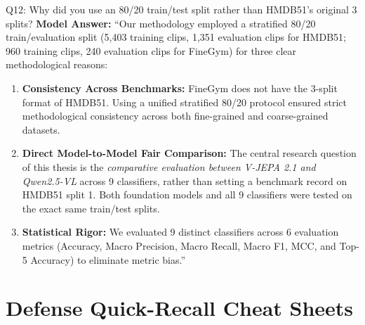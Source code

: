 \documentclass[a4paper, 11pt]{article}
\begin{document}
\vspace{0.2cm}

\begin{defensebox}{Q12: Why did you use an 80/20 train/test split rather than HMDB51's original 3 splits?}
\textbf{Model Answer:}
``Our methodology employed a stratified 80/20 train/evaluation split (5,403 training clips, 1,351 evaluation clips for HMDB51; 960 training clips, 240 evaluation clips for FineGym) for three clear methodological reasons:
\begin{enumerate}
    \item \textbf{Consistency Across Benchmarks:} FineGym does not have the 3-split format of HMDB51. Using a unified stratified 80/20 protocol ensured strict methodological consistency across both fine-grained and coarse-grained datasets.
    \item \textbf{Direct Model-to-Model Fair Comparison:} The central research question of this thesis is the \emph{comparative evaluation between V-JEPA 2.1 and Qwen2.5-VL} across 9 classifiers, rather than setting a benchmark record on HMDB51 split 1. Both foundation models and all 9 classifiers were tested on the exact same train/test splits.
    \item \textbf{Statistical Rigor:} We evaluated 9 distinct classifiers across 6 evaluation metrics (Accuracy, Macro Precision, Macro Recall, Macro F1, MCC, and Top-5 Accuracy) to eliminate metric bias.''
\end{enumerate}
\end{defensebox}

\vspace{0.3cm}

\section{Defense Quick-Recall Cheat Sheets}
\end{document}
